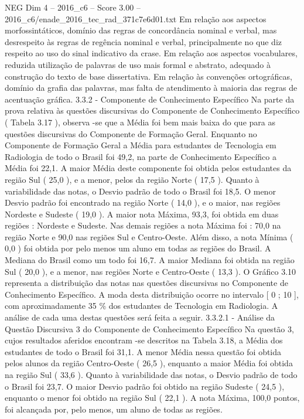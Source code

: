 \begin{textsample}{NEG Dim 4 – 2016\_c6 – Score 3.00 – 2016\_c6/enade\_2016\_tec\_rad\_371c7e6d01.txt}
Em relação aos aspectos morfossintáticos, domínio das regras de concordância nominal e verbal, mas desrespeito às regras de regência nominal e verbal, principalmente no que diz respeito ao uso do sinal indicativo da crase.
Em relação aos aspectos vocabulares, reduzida utilização de palavras de uso mais formal e abstrato, adequado à construção do texto de base dissertativa.
Em relação às convenções ortográficas, domínio da grafia das palavras, mas falta de atendimento à maioria das regras de acentuação gráfica. 3.3.2 - Componente de Conhecimento Específico Na parte da prova relativa às questões discursivas do Componente de Conhecimento Específico ( Tabela 3.17 ), observa -se que a Média foi bem mais baixa do que para as questões discursivas do Componente de Formação Geral.
Enquanto no Componente de Formação Geral a Média para estudantes de Tecnologia em Radiologia de todo o Brasil foi 49,2, na parte de Conhecimento Específico a Média foi 22,1.
A maior Média deste componente foi obtida pelos estudantes da região Sul ( 25,0 ), e a menor, pelos da região Norte ( 17,5 ).
Quanto à variabilidade das notas, o Desvio padrão de todo o Brasil foi 18,5.
O menor Desvio padrão foi encontrado na região Norte ( 14,0 ), e o maior, nas regiões Nordeste e Sudeste ( 19,0 ).
A maior nota Máxima, 93,3, foi obtida em duas regiões : Nordeste e Sudeste.
Nas demais regiões a nota Máxima foi : 70,0 na região Norte e 90,0 nas regiões Sul e Centro-Oeste.
Além disso, a nota Mínima ( 0,0 ) foi obtida por pelo menos um aluno em todas as regiões do Brasil.
A Mediana do Brasil como um todo foi 16,7.
A maior Mediana foi obtida na região Sul ( 20,0 ), e a menor, nas regiões Norte e Centro-Oeste ( 13,3 ).
O Gráfico 3.10 representa a distribuição das notas nas questões discursivas no Componente de Conhecimento Específico.
A moda desta distribuição ocorre no intervalo [ 0 ; 10 ], com aproximadamente 35 \% dos estudantes de Tecnologia em Radiologia.
A análise de cada uma destas questões será feita a seguir. 3.3.2.1 - Análise da Questão Discursiva 3 do Componente de Conhecimento Específico Na questão 3, cujos resultados aferidos encontram -se descritos na Tabela 3.18, a Média dos estudantes de todo o Brasil foi 31,1.
A menor Média nessa questão foi obtida pelos alunos da região Centro-Oeste ( 26,5 ), enquanto a maior Média foi obtida na região Sul ( 33,6 ).
Quanto à variabilidade das notas, o Desvio padrão de todo o Brasil foi 23,7.
O maior Desvio padrão foi obtido na região Sudeste ( 24,5 ), enquanto o menor foi obtido na região Sul ( 22,1 ).
A nota Máxima, 100,0 pontos, foi alcançada por, pelo menos, um aluno de todas as regiões.

\end{textsample}
